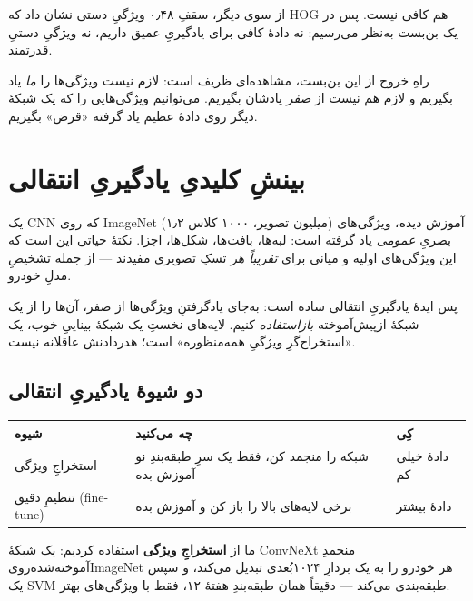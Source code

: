 \documentclass[12pt,a4paper]{article}
\begin{document}
از سوی دیگر، سقفِ ۰٫۴۸ ویژگیِ دستی نشان داد که HOG هم کافی نیست. پس در یک بن‌بست به‌نظر می‌رسیم: نه دادهٔ کافی برای یادگیریِ عمیق داریم، نه ویژگیِ دستیِ قدرتمند.

\begin{nokte}
راهِ خروج از این بن‌بست، مشاهده‌ای ظریف است: لازم نیست ویژگی‌ها را \emph{ما} یاد بگیریم و لازم هم نیست از \emph{صفر} یادشان بگیریم. می‌توانیم ویژگی‌هایی را که یک شبکهٔ دیگر روی دادهٔ عظیم یاد گرفته «قرض» بگیریم.
\end{nokte}

\section{بینشِ کلیدیِ یادگیریِ انتقالی}

یک CNN که روی ImageNet (۱٫۲ میلیون تصویر، ۱۰۰۰ کلاس) آموزش دیده، ویژگی‌های بصریِ \emph{عمومی} یاد گرفته است: لبه‌ها، بافت‌ها، شکل‌ها، اجزا. نکتهٔ حیاتی این است که این ویژگی‌های اولیه و میانی برای \emph{تقریباً هر} تسکِ تصویری مفیدند — از جمله تشخیصِ مدلِ خودرو.

\begin{yaddasht}
پس ایدهٔ یادگیریِ انتقالی ساده است: به‌جای یادگرفتنِ ویژگی‌ها از صفر، آن‌ها را از یک شبکهٔ از‌پیش‌آموخته \emph{بازاستفاده} کنیم. لایه‌های نخستِ یک شبکهٔ بیناییِ خوب، یک «استخراج‌گرِ ویژگیِ همه‌منظوره» است؛ هدر‌دادنش عاقلانه نیست.
\end{yaddasht}

\subsection{دو شیوهٔ یادگیریِ انتقالی}

\begin{center}
\begin{tabular}{@{}lll@{}}
\hline
\textbf{شیوه} & \textbf{چه می‌کنید} & \textbf{کِی} \\
\hline
استخراجِ ویژگی & شبکه را منجمد کن، فقط یک سرِ طبقه‌بندِ نو آموزش بده & دادهٔ خیلی کم \\
تنظیمِ دقیق (fine-tune) & برخی لایه‌های بالا را باز کن و آموزش بده & دادهٔ بیشتر \\
\hline
\end{tabular}
\end{center}

ما از \textbf{استخراجِ ویژگی} استفاده کردیم: یک شبکهٔ ConvNeXtِ منجمدِ آموخته‌شده‌روی‌ImageNet هر خودرو را به یک بردارِ ۱۰۲۴‌بُعدی تبدیل می‌کند، و سپس یک SVM طبقه‌بندی می‌کند — دقیقاً همان طبقه‌بندِ هفتهٔ ۱۲، فقط با ویژگی‌های بهتر.
\end{document}
